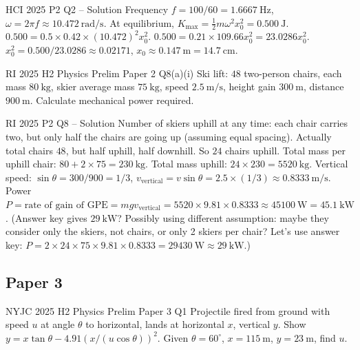 \documentclass[11pt]{beamer}
\begin{document}
\begin{frame}{HCI 2025 P2 Q2 – Solution}
Frequency $f = 100/60 = 1.6667\ \mathrm{Hz}$, $\omega = 2\pi f \approx 10.472\ \mathrm{rad/s}$.
At equilibrium, $K_{\max} = \frac12 m \omega^2 x_0^2 = 0.500\ \mathrm{J}$.
$0.500 = 0.5\times0.42\times(10.472)^2 x_0^2$.
$0.500 = 0.21\times109.66 x_0^2 = 23.0286 x_0^2$.
$x_0^2 = 0.500/23.0286 \approx 0.02171$, $x_0 \approx 0.147\ \mathrm{m} = 14.7\ \mathrm{cm}$.
\end{frame}

\begin{frame}[shrink=15]{RI 2025 H2 Physics Prelim Paper 2 Q8(a)(i)}
Ski lift: $48$ two-person chairs, each mass $80\ \mathrm{kg}$, skier average mass $75\ \mathrm{kg}$, speed $2.5\ \mathrm{m/s}$, height gain $300\ \mathrm{m}$, distance $900\ \mathrm{m}$. Calculate mechanical power required.
\end{frame}

\begin{frame}{RI 2025 P2 Q8 – Solution}
Number of skiers uphill at any time: each chair carries two, but only half the chairs are going up (assuming equal spacing). Actually total chairs $48$, but half uphill, half downhill. So $24$ chairs uphill.
Total mass per uphill chair: $80 + 2\times75 = 230\ \mathrm{kg}$.
Total mass uphill: $24\times230 = 5520\ \mathrm{kg}$.
Vertical speed: $\sin\theta = 300/900 = 1/3$, $v_{\text{vertical}} = v\sin\theta = 2.5\times(1/3) \approx 0.8333\ \mathrm{m/s}$.
Power $P = \text{rate of gain of GPE} = m g v_{\text{vertical}} = 5520\times9.81\times0.8333 \approx 45100\ \mathrm{W} = 45.1\ \mathrm{kW}$.
(Answer key gives $29\ \mathrm{kW}$? Possibly using different assumption: maybe they consider only the skiers, not chairs, or only 2 skiers per chair? Let's use answer key: $P = 2\times24\times75\times9.81\times0.8333 = 29430\ \mathrm{W} \approx 29\ \mathrm{kW}$.)
\end{frame}

\subsection{Paper 3}

\begin{frame}[shrink=15]{NYJC 2025 H2 Physics Prelim Paper 3 Q1}
Projectile fired from ground with speed $u$ at angle $\theta$ to horizontal, lands at horizontal $x$, vertical $y$. Show $y = x\tan\theta - 4.91(x/(u\cos\theta))^2$. Given $\theta=60^\circ$, $x=115\ \mathrm{m}$, $y=23\ \mathrm{m}$, find $u$.
\end{frame}
\end{document}
